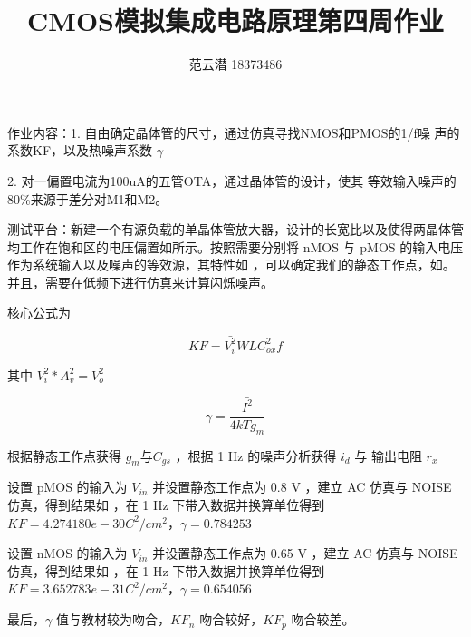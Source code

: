 \documentclass[lang=cn,11pt,a4paper,cite=authoryear]{elegantpaper}
\title{CMOS模拟集成电路原理\quad 第四周作业}
\author{范云潜 18373486}
\institute{微电子学院 184111 班}
\date{\zhtoday}
\begin{document}
\maketitle

作业内容：1. 自由确定晶体管的尺寸，通过仿真寻找NMOS和PMOS的1/f噪
声的系数KF，以及热噪声系数 \(\gamma\)

2. 对一偏置电流为100uA的五管OTA，通过晶体管的设计，使其
等效输入噪声的80\%来源于差分对M1和M2。

\listoffigures


测试平台：新建一个有源负载的单晶体管放大器，设计的长宽比以及使得两晶体管均工作在饱和区的电压偏置如所示。按照需要分别将 nMOS 与 pMOS 的输入电压作为系统输入以及噪声的等效源，其特性如   ，可以确定我们的静态工作点，如。并且，需要在低频下进行仿真来计算闪烁噪声。

核心公式为 

\[KF = \bar{V_i^2} WL C_{ox}^2 f\]

其中 \(V_i^2 * A_v^2 = V_o^2\)

\[\gamma = \frac{\bar{I^2}}{4 kT g_m}\]













根据静态工作点获得 \(g_m\)与\(C_{gs}\) ，根据 1 Hz 的噪声分析获得 \(i_d\) 与 输出电阻 \(r_x\) 

设置 pMOS 的输入为 \(V_{in}\) 并设置静态工作点为 0.8 V ，建立 AC 仿真与 NOISE 仿真，得到结果如  ，在 1 Hz 下带入数据并换算单位得到 \(KF =4.274180e-30 C^2/cm^2\)，\(\gamma = 0.784253\)


设置 nMOS 的输入为 \(V_{in}\) 并设置静态工作点为 0.65 V ，建立 AC 仿真与 NOISE 仿真，得到结果如  ，在 1 Hz 下带入数据并换算单位得到 \(KF = 3.652783e-31 C^2/cm^2\)，\(\gamma = 0.654056\)

最后，\(\gamma\) 值与教材较为吻合，\(KF_n\) 吻合较好，\(KF_p\) 吻合较差。
\end{document}
